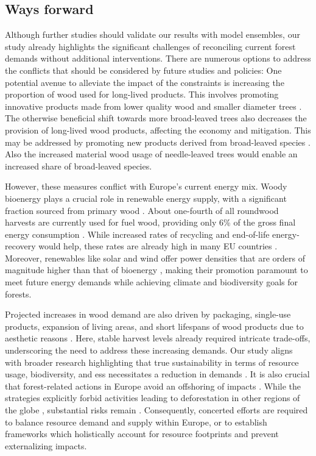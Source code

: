 \documentclass[]{article}
\begin{document}
\subsection{Ways forward}

Although further studies should validate our results with model ensembles, our study already highlights the significant challenges of reconciling current forest demands without additional interventions. There are numerous options to address the conflicts that should be considered by future studies and policies:
One potential avenue to alleviate the impact of the constraints is increasing the proportion of wood used for long-lived products.
This involves promoting innovative products made from lower quality wood and smaller diameter trees \parencite[e.g.,][]{RAMAGE2017}.
The otherwise beneficial shift towards more broad-leaved trees also decreases the provision of long-lived wood products, affecting the economy and mitigation. This may be addressed by promoting new products derived from broad-leaved species \parencite[e.g.,][]{Hassan2015}.
Also the increased material wood usage of needle-leaved trees would enable an increased share of broad-leaved species.

However, these measures conflict with Europe's current energy mix. Woody bioenergy plays a crucial role in renewable energy supply, with a significant fraction sourced from primary wood \parencite{EUForestStrategy2030, EUBioenergy2021}. About one-fourth of all roundwood harvests are currently used for fuel wood, providing only 6\% of the gross final energy consumption \parencite{EurostatForRemov2022, ScarlatNicolae2019}.
While increased rates of recycling and end-of-life energy-recovery would help, these rates are already high in many EU countries \parencite{EurostatWaste2023}.
Moreover, renewables like solar and wind offer power densities that are orders of magnitude higher than that of bioenergy \parencite{Smil2015}, making their promotion paramount to meet future energy demands while achieving climate and biodiversity goals for forests.

Projected increases in wood demand are also driven by packaging, single-use products, expansion of living areas, and short lifespans of wood products due to aesthetic reasons \parencite{Hill2022, FAO2022, Bierwirth2015}.
Here, stable harvest levels already required intricate trade-offs, underscoring the need to address these increasing demands.
Our study aligns with broader research highlighting that true sustainability in terms of resource usage, biodiversity, and \glspl{es} necessitates a reduction in demands \parencite[e.g.,][]{Richardson2023, Hickel2020}.
It is also crucial that forest-related actions in Europe avoid an offshoring of impacts \parencite{Berlik2002, Mayer2005}. While the strategies explicitly forbid activities leading to deforestation in other regions of the globe \parencite{EuropeanCommissionBiodivStrat2020}, substantial risks remain \parencite{Cerullo2023, Rosa2023}.
Consequently, concerted efforts are required to balance resource demand and supply within Europe, or to establish frameworks which holistically account for resource footprints and prevent externalizing impacts.
\end{document}
